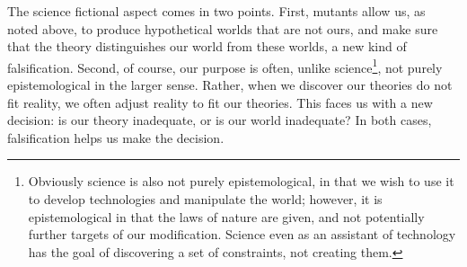 \documentclass{svjour3}
\begin{document}
The science fictional aspect comes in two points.  First, mutants
allow us, as noted above, to produce hypothetical worlds that are not
ours, and make sure that the theory distinguishes our world from these
worlds, a new kind of falsification.  Second, of course, our purpose
is often, unlike science\footnote{Obviously science is also not purely
  epistemological, in that we wish to use it to develop technologies
  and manipulate the world; however, it is epistemological in that the
  laws of nature are given, and not potentially further targets of our
  modification.  Science even as an assistant of technology has the
  goal of discovering a set of constraints, not creating them.}, not purely epistemological in the larger
sense.  Rather, when we discover our theories do not fit reality, we
often adjust reality to fit our theories.  This faces us with a new
decision:  is our theory inadequate, or is our world inadequate?  In
both cases, falsification helps us make the decision.

\end{document}
